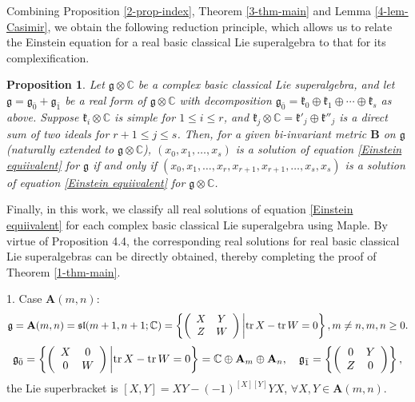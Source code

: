 \documentclass[reqno]{amsart}
\newtheorem{prop}[thm]{Proposition}
\theoremstyle{definition}
\begin{document}
Combining Proposition \ref{2-prop-index}, Theorem \ref{3-thm-main} and Lemma \ref{4-lem-Casimir},
we obtain the following reduction principle, which allows us to relate the Einstein equation for a real basic classical Lie superalgebra to that for its complexification.
\begin{prop}\label{4-prop-solution-real-complex}
Let $\mathfrak{g}\otimes\mathbb{C}$ be a complex basic classical Lie superalgebra, and let $\mathfrak{g}=\mathfrak{g}_{\bar{0}}+\mathfrak{g}_{\bar{1}}$ be a real form of
$\mathfrak{g}\otimes\mathbb{C}$ with decomposition  $\mathfrak{g}_{\bar{0}}=\mathfrak{k}_{0}\oplus\mathfrak{k}_{1}\oplus\cdots\oplus\mathfrak{k}_{s}$ as above. Suppose
$\mathfrak{k}_{i}\otimes\mathbb{C}$ is simple for  $1\leq i\leq r$,
and $\mathfrak{k}_{j}\otimes\mathbb{C}=\mathfrak{k}'_{j}\oplus\mathfrak{k}''_{j}$ is a direct sum of two ideals
for $r+1\leq j\leq s$. Then, for a given bi-invariant metric $\mathbf{B}$ on $\mathfrak{g}$
 (naturally extended to $\mathfrak{g}\otimes\mathbb{C}$),
$(x_{0},x_{1},\ldots,x_{s})$ is a solution of equation \eqref{Einstein equiivalent} for $\mathfrak{g}$ if and only if
$(x_{0},x_{1},\ldots,x_{r},x_{r+1},x_{r+1},\ldots,x_{s},x_{s})$ is a solution of equation \eqref{Einstein equiivalent} for $\mathfrak{g}\otimes\mathbb{C}$.
\end{prop}

Finally, in this work, we classify all real solutions of equation \eqref{Einstein equiivalent} for each complex basic classical Lie superalgebra  using Maple. By virtue of Proposition 4.4, the corresponding real solutions for real basic classical Lie superalgebras can be directly obtained,
thereby completing the proof of Theorem \ref{1-thm-main}.

1. Case $\mathbf{A}(m,n)$:
\begin{eqnarray*}
\mathfrak{g}=\mathbf{A}(m,n)=\mathfrak{sl}(m+1,n+1; \mathbb{C})=
\left\{\left(\begin{array}{cc}X&Y\\
                          Z&W
\end{array}\right)\bigg{|}\mathrm{tr}\,X-\mathrm{tr}\,W=0\right\}, m\neq n,m,n\geq 0.
\end{eqnarray*}
$$\mathfrak{g}_{\bar{0}}=\left\{\left(\begin{array}{cc}X&0\\
                          0&W
\end{array}\right)\bigg{|}\mathrm{tr}\,X-\mathrm{tr}\,W=0\right\}
=\mathbb{C}\oplus \mathbf{A}_{m}\oplus \mathbf{A}_{n},
\quad \mathfrak{g}_{\bar{1}}=\left\{\left(\begin{array}{cc}0&Y\\
                          Z&0
\end{array}\right)\right\},$$
 the Lie superbracket is  $[X,Y]=XY-(-1)^{[X][Y]}YX$, $\forall X,Y\in \mathbf{A}(m,n)$.
\end{document}
